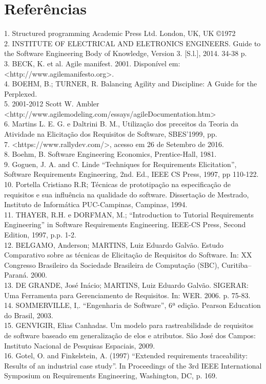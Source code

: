
\chapter[Referências]{Referências}
1. Structured programming  Academic Press Ltd. London, UK, UK ©1972\\
2. INSTITUTE OF ELECTRICAL AND ELETRONICS ENGINEERS. Guide to the Software Engineering Body of Knowledge, Version 3. [S.l.], 2014. 34-38 p.\\
3. BECK, K. et al. Agile manifest. 2001. Disponível em: <http://www.agilemanifesto.org>.\\
4. BOEHM, B.; TURNER, R. Balancing Agility and Discipline: A Guide for the Perplexed.\\
5. 2001-2012 Scott W. Ambler \\<http://www.agilemodeling.com/essays/agileDocumentation.htm>\\
6. Martins L. E. G. e Daltrini B. M., Utilização dos preceitos da Teoria da Atividade na Elicitação dos Requisitos de Software, SBES’1999, pp.\\
7. <https://www.rallydev.com/>, acesso em 26 de Setembro de 2016.\\
8. Boehm, B. Software Engineering Economics, Prentice-Hall, 1981.\\
9. Goguen, J. A. and C. Linde “Techniques for Requirements Elicitation”, Software Requirements Engineering, 2nd. Ed., IEEE CS Press, 1997, pp 110-122.\\
10. Portella Cristiano R.R; Técnicas de prototipação na especificação de requisitos e sua influência na qualidade do software. Dissertação de Mestrado, Instituto de Informática PUC-Campinas, Campinas, 1994.\\
11. THAYER, R.H. e DORFMAN, M.; “Introduction to Tutorial Requirements Engineering” in Software Requirements Engineering. IEEE-CS Press, Second Edition, 1997, p.p. 1-2.\\
12. BELGAMO, Anderson; MARTINS, Luiz Eduardo Galvão. Estudo Comparativo sobre as técnicas de Elicitação de Requisitos do Software. In: XX Congresso Brasileiro da Sociedade Brasileira de Computação (SBC), Curitiba–Paraná. 2000.\\
13. DE GRANDE, José Inácio; MARTINS, Luiz Eduardo Galvão. SIGERAR: Uma Ferramenta para Gerenciamento de Requisitos. In: WER. 2006. p. 75-83.\\
14. SOMMERVILLE, I,. “Engenharia de Software”, 6ª edição. Pearson Education do Brasil, 2003.\\
15. GENVIGIR, Elias Canhadas. Um modelo para rastreabilidade de requisitos de software baseado em generalização de elos e atributos. São José dos Campos: Instituto Nacional de Pesquisas Espaciais, 2009.\\
16. Gotel, O. and Finkelstein, A. (1997) “Extended requirements traceability: Results of an industrial case study”. In Proceedings of the 3rd IEEE International Symposium on Requirements Engineering, Washington, DC, p. 169.\\

